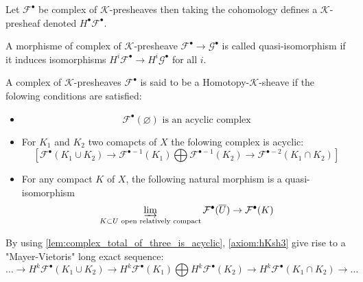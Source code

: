 \begin{definition}\label{def:cohomology_of_k-prsh}
    Let $\mathcal{F}^{\bullet}$ be complex of $\mathcal{K}$-presheaves then taking the cohomology defines a $\mathcal{K}$-presheaf denoted $H^{\bullet}\mathcal{F}^{\bullet}$.
\end{definition}

\begin{definition}\label{def:quasi_iso_of_complex_of_k-prsh}
    A morphisme of complex of $\mathcal{K}$-presheave $\mathcal{F}^{\bullet}\to\mathcal{G}^{\bullet}$ is called quasi-isomorphism if it induces isomorphisms $H^i\mathcal{F}^{\bullet}\to H^i\mathcal{G}^{\bullet}$ for all $i$.
\end{definition}

\begin{definition}\label{def:homotopy_k_sheaf}
    A complex of $\mathcal{K}$-presheaves $\mathcal{F}^{\bullet}$ is said to be a Homotopy-$\mathcal{K}$-sheave if the folowing conditions are satisfied:\begin{itemize}
        \item\begin{equation}\label{axiom:hKsh1}
            \mathcal{F}^{\bullet}(\varnothing) \text{ is an acyclic complex}
        \end{equation}
        \item For $K_1$ and $K_2$ two comapcts of $X$ the folowing complex is acyclic:\begin{equation}\label{axiom:hKsh2}
             [\mathcal{F}^{\bullet}(K_1\cup K_2)\to \mathcal{F}^{\bullet-1}(K_1)\bigoplus\mathcal{F}^{\bullet-1}(K_2)\to \mathcal{F}^{\bullet-2}(K_1\cap K_2) ]
        \end{equation}
        \item For any compact $K$ of $X$, the following natural morphism is a quasi-isomorphism \begin{equation}\label{axiom:hKsh3}
            \varinjlim\limits_{K\subset U\text{ open relatively compact}}\mathcal{F}^{\bullet}(\overline{U})\to \mathcal{F}^{\bullet}(K)
        \end{equation}
    \end{itemize}
\end{definition}

\begin{lemma}\label{lem:Mayer_Vietoris}
    By using \ref{lem:complex_total_of_three_is_acyclic}, \eqref{axiom:hKsh3} give rise to a "Mayer-Vietoris" long exact sequence: \[\ldots \to H^k \mathcal{F}^{\bullet}(K_1\cup K_2)\to H^k \mathcal{F}^{\bullet}(K_1)\bigoplus H^k\mathcal{F}^{\bullet}(K_2)\to H^k \mathcal{F}^{\bullet}(K_1\cap K_2)\to \ldots\]
\end{lemma}

